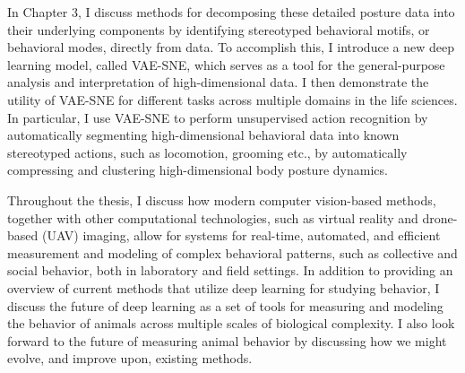 In Chapter 3, I discuss methods for decomposing these detailed posture data into their underlying components by identifying stereotyped behavioral motifs, or behavioral modes, directly from data. To accomplish this, I introduce a new deep learning model, called VAE-SNE, which serves as a tool for the general-purpose analysis and interpretation of high-dimensional data. I then demonstrate the utility of VAE-SNE for different tasks across multiple domains in the life sciences. In particular, I use VAE-SNE to perform unsupervised action recognition by automatically segmenting high-dimensional behavioral data into known stereotyped actions, such as locomotion, grooming etc., by automatically compressing and clustering high-dimensional body posture dynamics. 

Throughout the thesis, I discuss how modern computer vision-based methods, together with other computational technologies, such as virtual reality and drone-based (UAV) imaging, allow for systems for real-time, automated, and efficient measurement and modeling of complex behavioral patterns, such as collective and social behavior, both in laboratory and field settings. In addition to providing an overview of current methods that utilize deep learning for studying behavior, I discuss the future of deep learning as a set of tools for measuring and modeling the behavior of animals across multiple scales of biological complexity. I also look forward to the future of measuring animal behavior by discussing how we might evolve, and improve upon, existing methods.
